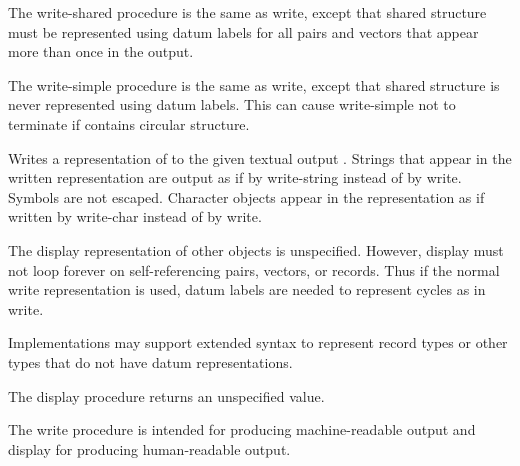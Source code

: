 \begin{entry}{%
}

The {\cf write-shared} procedure is the same as {\cf write}, except that
shared structure must be represented using datum labels for all pairs
and vectors that appear more than once in the output.

\end{entry}

\begin{entry}{%
}

The {\cf write-simple} procedure is the same as {\cf write}, except that shared structure is
never represented using datum labels.  This can cause {\cf write-simple} not to
terminate if  contains circular structure.

\end{entry}


\begin{entry}{%
}

Writes a representation of  to the given textual output .
Strings that appear in the written representation are output as if by
{\cf write-string} instead of by {\cf write}.
Symbols are not escaped.  Character
objects appear in the representation as if written by {\cf write-char}
instead of by {\cf write}.

The {\cf display} representation of other objects is unspecified.
However, {\cf display} must not loop forever on 
self-referencing pairs, vectors, or records.  Thus if the
normal {\cf write} representation is used, datum labels are needed
to represent cycles as in {\cf write}.

Implementations may support extended syntax to represent record types or
other types that do not have datum representations.

The {\cf display} procedure returns an unspecified value.

\begin{rationale}
The {\cf write} procedure is intended
for producing mach\-ine-readable output and {\cf display} for producing
human-readable output.  
\end{rationale}
\end{entry}


